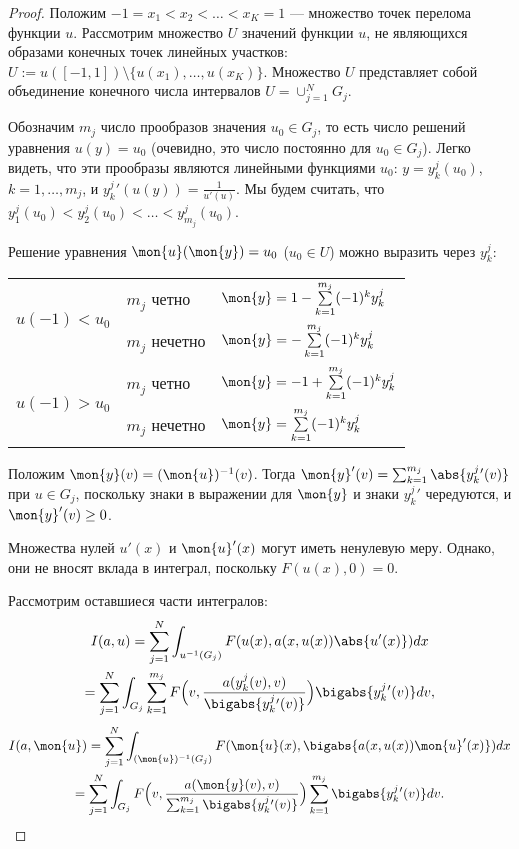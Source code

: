 \begin{proof}
Положим $-1 = x_1 < x_2 < \dots < x_K = 1$ --- множество точек перелома функции $u$.
Рассмотрим множество $U$ значений функции $u$, не являющихся образами конечных точек
линейных участков: $U := u( [-1, 1] ) \setminus \{ u(x_1), \dots, u(x_K) \}$.
Множество $U$ представляет собой объединение конечного числа интервалов $U = \cup_{j = 1}^N G_j$.

Обозначим $m_j$ число прообразов значения $u_0 \in G_j$,
то есть число решений уравнения $u(y) = u_0$ 
(очевидно, это число постоянно для $u_0 \in G_j$).
Легко видеть, что эти прообразы являются линейными функциями $u_0$:
$y = y_k^j(u_0)$, $k = 1, \dots, m_j$,
и $y_k^j{}'(u(y)) = \frac{1}{u'(u)}$.
Мы будем считать, что $y_1^j(u_0) < y_2^j(u_0) < \dots < y_{m_j}^j(u_0)$.

Решение уравнения $\mon{u}(\mon{y})=u_0$ ($u_0 \in U$) можно выразить через $y_k^j$:

\begin{center}
\begin{tabular}{l|l|l} 
\multirow{2}{*}{$u(-1)<u_0$ \rule[-34pt]{0pt}{65pt}} & $m_j$ четно   & $\mon{y}=1-\sum\limits_{k=1}^{m_j} (-1)^k y_k^j$ \rule[-17pt]{0pt}{40pt} \\
                                                     & $m_j$ нечетно & $\mon{y}=-\sum\limits_{k=1}^{m_j} (-1)^k y_k^j$ \rule[-17pt]{0pt}{40pt} \\ \hline
\multirow{2}{*}{$u(-1)>u_0$ \rule[-34pt]{0pt}{65pt}} & $m_j$ четно   & $\mon{y}=-1+\sum\limits_{k=1}^{m_j} (-1)^k y_k^j$ \rule[-17pt]{0pt}{40pt} \\
                                                     & $m_j$ нечетно & $\mon{y}=\sum\limits_{k=1}^{m_j} (-1)^k y_k^j$ \rule[-17pt]{0pt}{40pt} \\
\end{tabular}
\end{center}

Положим $\mon{y}(v) = (\mon{u})^{-1}(v)$.
Тогда $\mon{y}'(v) = \sum_{k=1}^{m_j} \abs{y_k^j{}'(v)}$ при $u \in G_j$, поскольку знаки в выражении для
$\mon{y}$ и знаки $y_k^j{}'$ чередуются, и $\mon{y}'(v)\ge 0$.

Множества нулей $u'(x)$ и $\mon{u}'(x)$ могут иметь ненулевую меру.
Однако, они не вносят вклада в интеграл, поскольку $F(u(x), 0) = 0$.

Рассмотрим оставшиеся части интегралов:
\begin{multline*}
I(a, u) = \sum_{j=1}^N \int_{u^{-1}(G_j)} F(u(x), a(x, u(x)) \abs{u'(x)}) dx
\\ = \sum_{j=1}^N \int_{G_j} \sum_{k=1}^{m_j} F \Bigl( v, \frac{a(y_k^j(v), v)}{\bigabs{y_k^j{}'(v)}} \Bigr) \bigabs{y_k^j{}'(v)} dv,
\end{multline*}
\begin{multline*}
I(a, \mon{u}) = \sum_{j=1}^N \int_{(\mon{u})^{-1}(G_j)} F(\mon{u}(x), \bigabs{a(x, u(x)) \mon{u}'(x)}) dx
\\ = \sum_{j=1}^N \int_{G_j} F \Bigl( v, \frac{a(\mon{y}(v), v)}{\sum_{k=1}^{m_j} \bigabs{y_k^j{}'(v)}} \Bigr)
\sum_{k=1}^{m_j} \bigabs{ y_k^j{}'(v) } dv.
\end{multline*}


\end{proof}
